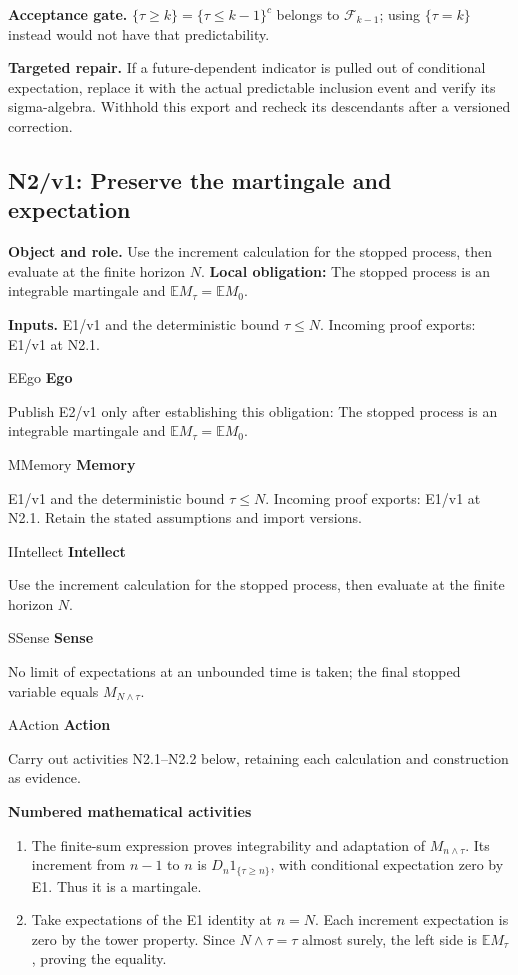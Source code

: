 \documentclass[preprint,12pt,aps,pra,showkeys,amsmath,amssymb,superscriptaddress,floatfix]{revtex4-2}
\theoremstyle{definition}
\theoremstyle{remark}
\newcommand{\mmfaculty}[3]{%
 \begin{mmfacultybox}{#1}{#2}
 {\sffamily\bfseries\color{MMBlue}#2}\par\smallskip #3
 \end{mmfacultybox}}
\newcommand{\field}[2]{\par\smallskip\noindent\textbf{#1.} #2\par}
\begin{document}
\field{Acceptance gate}{\(\{\tau\ge k\}=\{\tau\le k-1\}^c\) belongs to \(\mathcal F_{k-1}\);
using \(\{\tau=k\}\) instead would not have that predictability.}

\field{Targeted repair}{If a future-dependent indicator is pulled out of conditional
expectation, replace it with the actual predictable inclusion event and
verify its sigma-algebra. Withhold this export and recheck its
descendants after a versioned correction.}

\clearpage

\subsection{N2/v1: Preserve the martingale and expectation}

\field{Object and role}{Use the increment calculation for the stopped process, then evaluate at
the finite horizon \(N\). \textbf{Local obligation:} The stopped process
is an integrable martingale and \(\mathbb EM_\tau=\mathbb EM_0\).}

\field{Inputs}{E1/v1 and the deterministic bound \(\tau\le N\). Incoming proof exports:
E1/v1 at N2.1.}

\mmfaculty{E}{Ego}{Publish E2/v1 only after establishing this obligation: The stopped
process is an integrable martingale and
\(\mathbb EM_\tau=\mathbb EM_0\).}

\mmfaculty{M}{Memory}{E1/v1 and the deterministic bound \(\tau\le N\). Incoming proof exports:
E1/v1 at N2.1. Retain the stated assumptions and import versions.}

\mmfaculty{I}{Intellect}{Use the increment calculation for the stopped process, then evaluate at
the finite horizon \(N\).}

\mmfaculty{S}{Sense}{No limit of expectations at an unbounded time is taken; the final
stopped variable equals \(M_{N\wedge\tau}\).}

\mmfaculty{A}{Action}{Carry out activities N2.1--N2.2 below, retaining each calculation and
construction as evidence.}

\smallskip\noindent\textbf{Numbered mathematical activities}

\begin{enumerate}[label=N2.\arabic*,leftmargin=3.4em]

\item The finite-sum expression proves integrability and adaptation of
\(M_{n\wedge\tau}\). Its increment from \(n-1\) to \(n\) is
\(D_n1_{\{\tau\ge n\}}\), with conditional expectation zero by E1. Thus
it is a martingale.

\item Take expectations of the E1 identity at \(n=N\). Each increment
expectation is zero by the tower property. Since \(N\wedge\tau=\tau\)
almost surely, the left side is \(\mathbb EM_\tau\), proving the
equality.

\end{enumerate}
\end{document}
